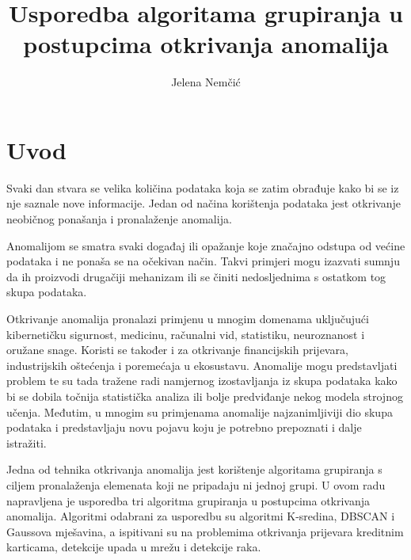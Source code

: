 \documentclass[utf8, diplomski, numeric]{fer}
\begin{document}

\title{Usporedba algoritama grupiranja u postupcima otkrivanja anomalija}

\author{Jelena Nemčić}

\maketitle



\zahvala{}

\tableofcontents

\chapter{Uvod} \label{ch:first}

Svaki dan stvara se velika količina podataka koja se zatim obrađuje kako bi se iz nje saznale nove informacije. Jedan od načina korištenja podataka jest otkrivanje neobičnog ponašanja i pronalaženje anomalija.

Anomalijom se smatra svaki događaj ili opažanje koje značajno odstupa od većine podataka i ne ponaša se na očekivan način. Takvi primjeri mogu izazvati sumnju da ih proizvodi drugačiji mehanizam ili se činiti nedosljednima s ostatkom tog skupa podataka.

Otkrivanje anomalija pronalazi primjenu u mnogim domenama uključujući kibernetičku sigurnost, medicinu, računalni vid, statistiku, neuroznanost i oružane snage. Koristi se također i za otkrivanje financijskih prijevara, industrijskih oštećenja i poremećaja u ekosustavu. Anomalije mogu predstavljati problem te su tada tražene radi namjernog izostavljanja iz skupa podataka kako bi se dobila točnija statistička analiza ili bolje predviđanje nekog modela strojnog učenja. Međutim, u mnogim su primjenama anomalije najzanimljiviji dio skupa podataka i predstavljaju novu pojavu koju je potrebno prepoznati i dalje istražiti.

Jedna od tehnika otkrivanja anomalija jest korištenje algoritama grupiranja s ciljem pronalaženja elemenata koji ne pripadaju ni jednoj grupi. U ovom radu napravljena je usporedba tri algoritma grupiranja u postupcima otkrivanja anomalija. Algoritmi odabrani za usporedbu su algoritmi K-sredina, DBSCAN i Gaussova mješavina, a ispitivani su na problemima otkrivanja prijevara kreditnim karticama, detekcije upada u mrežu i detekcije raka. 
\end{document}
